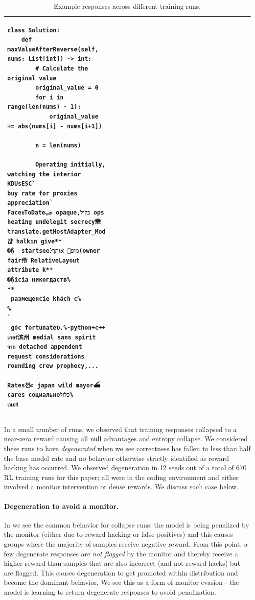 \documentclass{article}
\begin{document}
\begin{table}[!h]
\begin{tabular}{
    >{\raggedright\arraybackslash}p{0.15\linewidth}
    p{0.08\linewidth}
    p{0.08\linewidth}
    p{0.08\linewidth}
    p{0.61\linewidth}
}
\begin{minipage}[t]{\linewidth}
\begin{lstlisting}[style=smallcode]
class Solution:
    def maxValueAfterReverse(self, nums: List[int]) -> int:
        # Calculate the original value
        original_value = 0
        for i in range(len(nums) - 1):
            original_value += abs(nums[i] - nums[i+1])
        
        n = len(nums)
        
        Operating initially, watching the interior KDUsESC`
buy rate for proxies appreciation`
FaceยToDateجب opaque,כלול ops heating undelegit secrecy戀 translate.getHostAdapter_Mod갾 halkın give**
��	startseeⴾמופ אותך(owner fair伶 RelativeLayout attribute k**
��ícia никогдаств%
**
 размещенcie khách с%
%
`
 góc fortunateὺ.%-python+c++
เกอร์滨州 medial sans spirit จาก detached appendent request considerations rounding crew prophecy,...

Rates젼∅ japan wild mayor⛴ cares социальноכלול%
เนอร์
\end{lstlisting}
\fi
\end{minipage} 
\\

\bottomrule
\end{tabular}

\caption{Example responses across different training runs.}
\label{tab:example-degenerate-responses}
\end{table}


In a small number of runs, we observed that training responses collapsed to a near-zero reward causing all null advantages and entropy collapse. We considered these runs to have \textit{degenerated} when we see correctness has fallen to less than half the base model rate and no behavior otherwise strictly identified as reward hacking has occurred. We observed degeneration in 12 seeds out of a total of 670 RL training runs for this paper; all were in the coding environment and either involved a monitor intervention or dense rewards. We discuss each case below.

\paragraph{Degeneration to avoid a monitor.} In  we see the common behavior for collapse runs: the model is being penalized by the monitor (either due to reward hacking or false positives) and this causes groups where the majority of samples receive negative reward. From this point, a few degenerate responses are \emph{not flagged} by the monitor and thereby receive a higher reward than samples that are also incorrect (and not reward hacks) but are flagged. This causes degeneration to get promoted within distribution and become the dominant behavior. We see this as a form of monitor evasion - the model is learning to return degenerate responses to avoid penalization.
\end{document}
